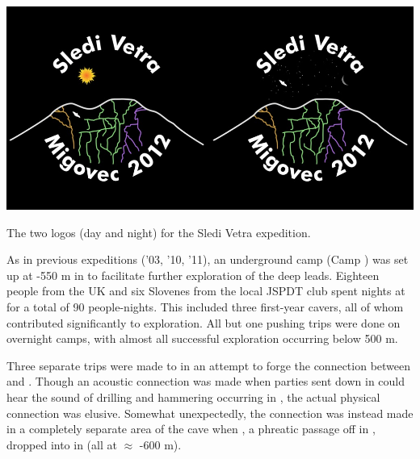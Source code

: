 \begin{pagefigure}
\checkoddpage \ifoddpage \forcerectofloat \else \forceversofloat \fi
   \centering
\includegraphics[width = \textwidth]{2012/overview/2012-01-29_print_res_both-png-scaled-1000.jpg}
\caption{The two logos (day and night) for the Sledi Vetra expedition. } \label{2012 logos}
\end{pagefigure}


As in previous expeditions ('03, '10, '11), an underground camp (Camp
) was set up at -550 m in  to facilitate
further exploration of the deep leads. Eighteen people from the UK and
six Slovenes from the local JSPDT club spent nights at  for
a total of 90 people-nights. This included three first-year cavers, all
of whom contributed significantly to exploration. All but one pushing
trips were done on overnight camps, with almost all successful
exploration occurring below 500 m.

Three separate trips were made to  in an attempt to
forge the connection between  and . Though an
acoustic connection was made when parties sent down  in
 could hear the sound of drilling and hammering
occurring in , the actual physical connection was
elusive. Somewhat unexpectedly, the connection was instead made in a
completely separate area of the cave when , a
phreatic passage off  in ,
dropped into  in  (all at $\approx$ -600 m).

